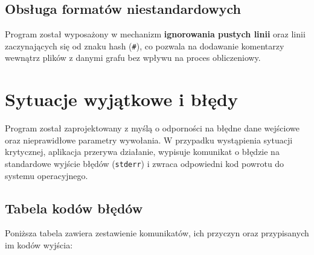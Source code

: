 \documentclass[12pt,a4paper]{article}
\begin{document}
\subsection{Obsługa formatów niestandardowych}
Program został wyposażony w mechanizm \textbf{ignorowania pustych linii} oraz linii zaczynających się od znaku hash (\texttt{\#}), co pozwala na dodawanie komentarzy wewnątrz plików z danymi grafu bez wpływu na proces obliczeniowy.

\section{Sytuacje wyjątkowe i błędy}

Program został zaprojektowany z myślą o odporności na błędne dane wejściowe oraz nieprawidłowe parametry wywołania. W przypadku wystąpienia sytuacji krytycznej, aplikacja przerywa działanie, wypisuje komunikat o błędzie na standardowe wyjście błędów (\texttt{stderr}) i zwraca odpowiedni kod powrotu do systemu operacyjnego.

\subsection{Tabela kodów błędów}

Poniższa tabela zawiera zestawienie komunikatów, ich przyczyn oraz przypisanych im kodów wyjścia:
\end{document}
